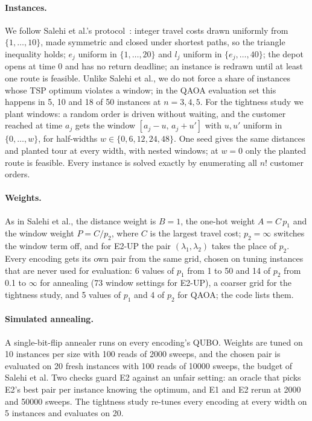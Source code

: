 \paragraph{Instances.}
We follow Salehi et al.'s protocol~\cite{salehi2022unconstrained}: integer travel costs drawn
uniformly from $\{1,\dots,10\}$, made symmetric and closed under shortest paths, so the triangle
inequality holds; $e_j$ uniform in $\{1,\dots,20\}$ and $l_j$ uniform in $\{e_j,\dots,40\}$; the
depot opens at time $0$ and has no return deadline; an instance is redrawn until at least one
route is feasible. Unlike Salehi et al., we do not force a share of instances whose TSP optimum
violates a window; in the QAOA evaluation set this happens in 5, 10 and 18 of 50 instances at
$n=3,4,5$. For the tightness study we plant windows: a random order is driven without waiting,
and the customer reached at time $a_j$ gets the window $[a_j-u,\,a_j+u']$ with $u,u'$ uniform in
$\{0,\dots,w\}$, for half-widths $w\in\{0,6,12,24,48\}$. One seed gives the same distances and
planted tour at every width, with nested windows; at $w=0$ only the planted route is feasible.
Every instance is solved exactly by enumerating all $n!$ customer orders.

\paragraph{Weights.}
As in Salehi et al., the distance weight is $B=1$, the one-hot weight $A=C\,p_1$ and the window
weight $P=C/p_2$, where $C$ is the largest travel cost; $p_2=\infty$ switches the window term
off, and for E2-UP the pair $(\lambda_1,\lambda_2)$ takes the place of $p_2$. Every encoding gets
its own pair from the same grid, chosen on tuning instances that are never used for evaluation:
6 values of $p_1$ from 1 to 50 and 14 of $p_2$ from 0.1 to $\infty$ for annealing (73 window
settings for E2-UP), a coarser grid for the tightness study, and 5 values of $p_1$ and 4 of
$p_2$ for QAOA; the code lists them.

\paragraph{Simulated annealing.}
A single-bit-flip annealer runs on every encoding's QUBO. Weights are tuned on 10 instances per
size with 100 reads of 2000 sweeps, and the chosen pair is evaluated on 20 fresh instances with
100 reads of 10000 sweeps, the budget of Salehi et al. Two checks guard E2 against an unfair
setting: an oracle that picks E2's best pair per instance knowing the optimum, and E1 and E2
rerun at 2000 and 50000 sweeps. The tightness study re-tunes every encoding at every width on
5 instances and evaluates on 20.

